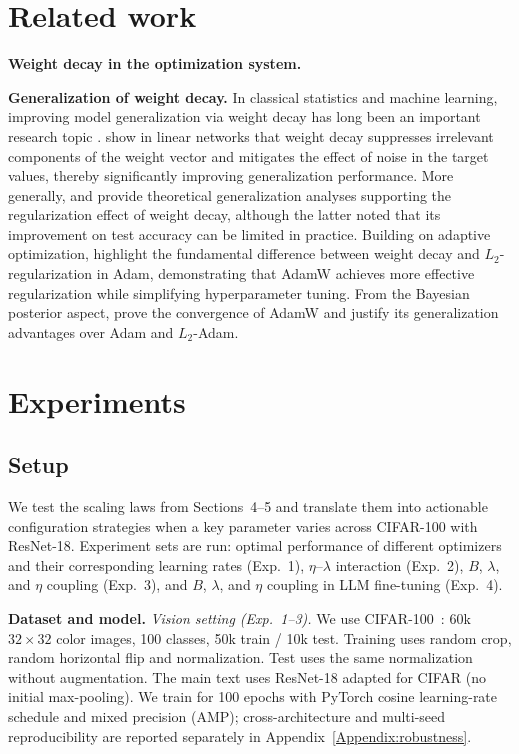 \section{Related work}\label{related}
\textbf{Weight decay in the optimization system.} 


\textbf{Generalization of weight decay.} 
In classical statistics and machine learning, improving model generalization via weight decay has long been an important research topic \cite{doi:10.1137/0109031,Hoerl,a92f3c16-7c6e-31d3-b403-82d2b0a469e4}. \citet{10.5555/2986916.2987033} show in linear networks that weight decay suppresses irrelevant components of the weight vector and mitigates the effect of noise in the target values, thereby significantly improving generalization performance. More generally, \citet{ShalevShwartz2014UnderstandingML} and \citet{Zhang2016UnderstandingDL} provide theoretical generalization analyses supporting the regularization effect of weight decay, although the latter noted that its improvement on test accuracy can be limited in practice. Building on adaptive optimization, \citet{Loshchilov2017DecoupledWD} highlight the fundamental difference between weight decay and $L_2$-regularization in Adam, demonstrating that AdamW achieves more effective regularization while simplifying hyperparameter tuning. From the Bayesian posterior aspect, \citet{Zhou2024TowardsUC} prove the convergence of AdamW and justify its generalization advantages over Adam and $L_2$-Adam.

\section{Experiments}\label{Appendix:exp}

\subsection{Setup}
We test the scaling laws from Sections~4--5 and translate them into actionable configuration strategies when a key parameter varies across CIFAR-100 with ResNet-18. Experiment sets are run: optimal performance of different optimizers and their corresponding learning rates (Exp.~1), $\eta$--$\lambda$ interaction (Exp.~2), $B$, $\lambda$, and $\eta$ coupling (Exp.~3), and $B$, $\lambda$, and $\eta$ coupling in LLM fine-tuning (Exp.~4).

\textbf{Dataset and model.}
\emph{Vision setting (Exp.~1--3).}
We use CIFAR-100~\cite{krizhevsky2009learning}: 60k $32{\times}32$ color images, 100 classes, 50k train / 10k test. Training uses random crop, random horizontal flip and normalization. Test uses the same normalization without augmentation. The main text uses ResNet-18 adapted for CIFAR (no initial max-pooling). We train for 100 epochs with PyTorch cosine learning-rate schedule and mixed precision (AMP); cross-architecture and multi-seed reproducibility are reported separately in Appendix~\ref{Appendix:robustness}.

